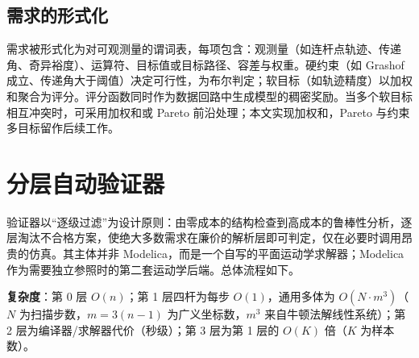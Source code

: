 \documentclass[UTF8,11pt,a4paper]{ctexart}
\begin{document}
\subsection{需求的形式化}
需求被形式化为对可观测量的谓词表，每项包含：观测量（如连杆点轨迹、传递角、奇异裕度）、运算符、目标值或目标路径、容差与权重。硬约束（如 Grashof 成立、传递角大于阈值）决定可行性，为布尔判定；软目标（如轨迹精度）以加权和聚合为评分。评分函数同时作为数据回路中生成模型的稠密奖励。当多个软目标相互冲突时，可采用加权和或 Pareto 前沿处理；本文实现加权和，Pareto 与约束多目标留作后续工作。

\section{分层自动验证器}
验证器以``逐级过滤''为设计原则：由零成本的结构检查到高成本的鲁棒性分析，逐层淘汰不合格方案，使绝大多数需求在廉价的解析层即可判定，仅在必要时调用昂贵的仿真。其主体并非 Modelica，而是一个自写的平面运动学求解器；Modelica 作为需要独立参照时的第二套运动学后端。总体流程如下。

\begin{center}
\end{center}

\textbf{复杂度}：第 0 层 $O(n)$；第 1 层四杆为每步 $O(1)$，通用多体为 $O(N\cdot m^3)$（$N$ 为扫描步数，$m=3(n-1)$ 为广义坐标数，$m^3$ 来自牛顿法解线性系统）；第 2 层为编译器/求解器代价（秒级）；第 3 层为第 1 层的 $O(K)$ 倍（$K$ 为样本数）。
\end{document}
